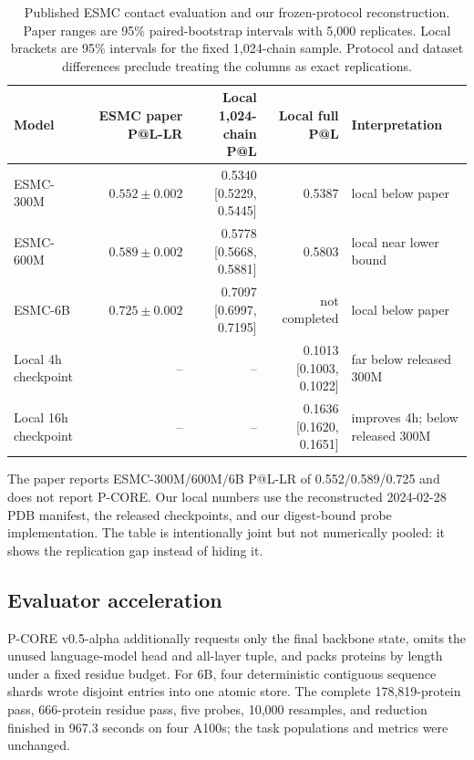 \documentclass{article}
\begin{document}
\begin{table}[H]
  \centering
  \scriptsize
  \setlength{\tabcolsep}{3pt}
  \begin{tabularx}{\textwidth}{@{}lrrrY@{}}
    \toprule
    Model & ESMC paper P@L-LR & Local 1,024-chain P@L & Local full P@L & Interpretation \\
    \midrule
    ESMC-300M & $0.552\pm0.002$ & 0.5340 [0.5229, 0.5445] & 0.5387 & local below paper \\
    ESMC-600M & $0.589\pm0.002$ & 0.5778 [0.5668, 0.5881] & 0.5803 & local near lower bound \\
    ESMC-6B & $0.725\pm0.002$ & 0.7097 [0.6997, 0.7195] & not completed & local below paper \\
    Local 4h checkpoint & -- & -- & 0.1013 [0.1003, 0.1022] & far below released 300M \\
    Local 16h checkpoint & -- & -- & 0.1636 [0.1620, 0.1651] & improves 4h; below released 300M \\
    \bottomrule
  \end{tabularx}
  \caption{Published ESMC contact evaluation and our frozen-protocol reconstruction. Paper ranges are 95\% paired-bootstrap intervals with 5,000 replicates. Local brackets are 95\% intervals for the fixed 1,024-chain sample. Protocol and dataset differences preclude treating the columns as exact replications.}
  \label{tab:contact-compare}
\end{table}

The paper reports ESMC-300M/600M/6B P@L-LR of 0.552/0.589/0.725 and does not
report P-CORE. Our local numbers use the reconstructed 2024-02-28 PDB manifest,
the released checkpoints, and our digest-bound probe implementation. The table
is intentionally joint but not numerically pooled: it shows the replication
gap instead of hiding it.

\subsection{Evaluator acceleration}

P-CORE v0.5-alpha additionally requests only the final backbone state, omits
the unused language-model head and all-layer tuple, and packs proteins by
length under a fixed residue budget. For 6B, four deterministic contiguous
sequence shards wrote disjoint entries into one atomic store. The complete
178,819-protein pass, 666-protein residue pass, five probes, 10,000 resamples,
and reduction finished in 967.3 seconds on four A100s; the task populations and
metrics were unchanged.
\end{document}
